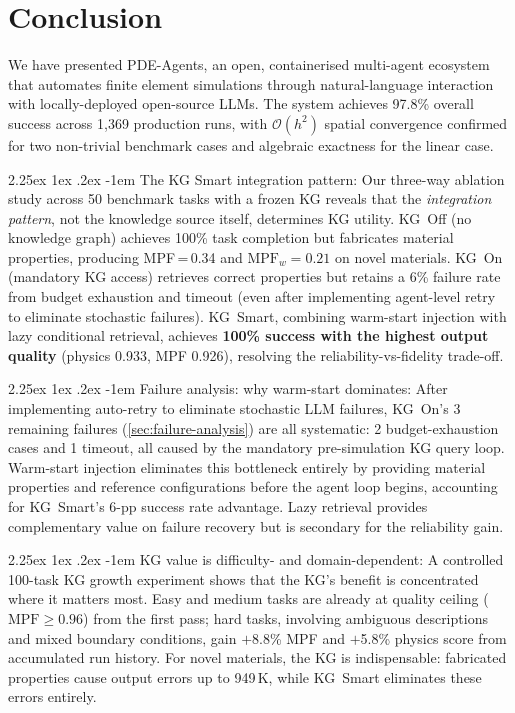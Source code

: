 \documentclass[preprint,review,12pt]{elsarticle}
\makeatletter
\renewcommand\paragraph{\@startsection{paragraph}{4}{\z@}%
  {2.25ex \@plus1ex \@minus.2ex}%
  {-1em}%
  {\normalfont\normalsize\bfseries}}
\makeatother
\begin{document}
\section{Conclusion}
\label{sec:conclusion}

We have presented PDE-Agents, an open, containerised multi-agent ecosystem
that automates finite element simulations through natural-language interaction
with locally-deployed open-source LLMs.  The system achieves 97.8\% overall
success across 1{,}369 production runs, with $\mathcal{O}(h^2)$
spatial convergence confirmed for two non-trivial benchmark cases
and algebraic exactness for the linear case.

\paragraph{The KG Smart integration pattern:}
Our three-way ablation study across 50 benchmark tasks with a frozen KG
reveals that the \emph{integration pattern}, not the knowledge source
itself, determines KG utility.  KG~Off (no knowledge graph) achieves
100\% task completion but fabricates material properties, producing
MPF\,=\,0.34 and $\text{MPF}_w{=}0.21$ on novel materials.
KG~On (mandatory KG access) retrieves correct properties but retains
a 6\% failure rate from budget exhaustion and timeout (even after
implementing agent-level retry to eliminate stochastic failures).
KG~Smart, combining warm-start injection with lazy conditional
retrieval, achieves \textbf{100\% success with the highest output
quality} (physics 0.933, MPF 0.926), resolving the
reliability-vs-fidelity trade-off.

\paragraph{Failure analysis: why warm-start dominates:}
After implementing auto-retry to eliminate stochastic LLM failures,
KG~On's 3 remaining failures (\cref{sec:failure-analysis}) are all
systematic: 2 budget-exhaustion cases and 1 timeout, all caused by
the mandatory pre-simulation KG query loop.  Warm-start injection
eliminates this bottleneck entirely by providing material properties
and reference configurations before the agent loop begins,
accounting for KG~Smart's 6-pp success rate advantage.  Lazy retrieval
provides complementary value on failure recovery but is secondary
for the reliability gain.

\paragraph{KG value is difficulty- and domain-dependent:}
A controlled 100-task KG growth experiment shows that the KG's benefit
is concentrated where it matters most.  Easy and medium tasks are already
at quality ceiling ($\text{MPF}{\geq}0.96$) from the first pass; hard
tasks, involving ambiguous descriptions and mixed boundary conditions, gain
$+$8.8\% MPF and $+$5.8\% physics score from accumulated run history.
For novel materials, the KG is indispensable: fabricated properties cause
output errors up to 949\,K, while KG~Smart eliminates these errors entirely.
\end{document}
